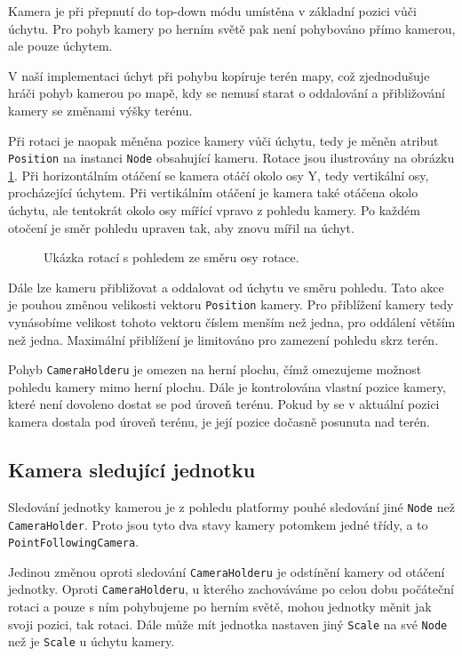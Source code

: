 Kamera je při přepnutí do top-down módu umístěna v základní pozici vůči úchytu. Pro pohyb kamery po herním světě pak není pohybováno přímo kamerou, ale pouze úchytem.

V naší implementaci úchyt při pohybu kopíruje terén mapy, což zjednodušuje hráči pohyb kamerou po mapě, kdy se nemusí starat o oddalování a přibližování kamery se změnami výšky terénu. 

Při rotaci je naopak měněna pozice kamery vůči úchytu, tedy je měněn atribut \texttt{Position} na instanci \texttt{Node} obsahující kameru. Rotace jsou ilustrovány na obrázku \ref{fig:rotation}. Při horizontálním otáčení se kamera otáčí okolo osy Y, tedy vertikální osy, procházející úchytem.  Při vertikálním otáčení je kamera také otáčena okolo úchytu, ale tentokrát okolo osy mířící vpravo z pohledu kamery. Po každém otočení je směr pohledu upraven tak, aby znovu mířil na úchyt.

\begin{figure}[h]
	\centering
	\fontsize{8pt}{11pt}\selectfont
	\def\svgwidth{\textwidth}
	
	\caption{Ukázka rotací s pohledem ze směru osy rotace.}
	\label{fig:rotation}
\end{figure}

Dále lze kameru přibližovat a oddalovat od úchytu ve směru pohledu. Tato akce je pouhou změnou velikosti vektoru \texttt{Position} kamery. Pro přiblížení kamery tedy vynásobíme velikost tohoto vektoru číslem menším než jedna, pro oddálení větším než jedna. Maximální přiblížení je limitováno pro zamezení pohledu skrz terén.

Pohyb \texttt{CameraHolderu} je omezen na herní plochu, čímž omezujeme možnost pohledu kamery mimo herní plochu. Dále je kontrolována vlastní pozice kamery, které není dovoleno dostat se pod úroveň terénu. Pokud by se v aktuální pozici kamera dostala pod úroveň terénu, je její pozice dočasně posunuta nad terén.

\subsection{Kamera sledující jednotku}
Sledování jednotky kamerou je z pohledu platformy pouhé sledování jiné \texttt{Node} než \texttt{CameraHolder}. Proto jsou tyto dva stavy kamery potomkem jedné třídy, a to \texttt{PointFollowingCamera}. 

Jedinou změnou oproti sledování \texttt{CameraHolderu} je odstínění kamery od otáčení jednotky. Oproti \texttt{CameraHolderu}, u kterého zachováváme po celou dobu počáteční rotaci a pouze s ním pohybujeme po herním světě, mohou jednotky měnit jak svoji pozici, tak rotaci. Dále může mít jednotka nastaven jiný \texttt{Scale} na své \texttt{Node} než je \texttt{Scale} u úchytu kamery. 

